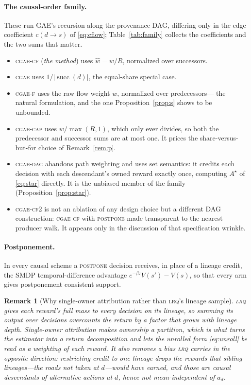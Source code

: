 \documentclass[review,authoryear,3p,times]{elsarticle}
\newtheorem{remark}{Remark}
\newcommand{\cgae}{\textsc{cgae}}              %
\newcommand{\cflow}{\textsc{cgae-cf}}          %
\newcommand{\cflowraw}{\textsc{cgae-f}}        %
\newcommand{\cdag}{\textsc{cgae-dag}}          %
\newcommand{\ccap}{\textsc{cgae-cap}}          %
\newcommand{\lrq}{\textsc{lrq}}
\newcommand{\suc}{\operatorname{succ}}
\begin{document}
\paragraph{The causal-order family.} These run GAE's recursion along the
provenance DAG, differing only in the edge coefficient $c(d\!\to\!s)$ of
\eqref{eq:cflow}; Table~\ref{tab:family} collects the coefficients and the two
sums that matter.
\begin{itemize}
\item \cflow{} (\emph{the method}) uses $\hat w = w/R$, normalized over
successors.
\item \cgae{} uses $1/|\suc(d)|$, the equal-share special case.
\item \cflowraw{} uses the raw flow weight $w$, normalized over predecessors---
the natural formulation, and the one Proposition~\ref{prop:s} shows to be
unbounded.
\item \ccap{} uses $w/\max(R,1)$, which only ever divides, so both the
predecessor and successor sums are at most one. It prices the
share-versus-but-for choice of Remark~\ref{rem:p}.
\item \cdag{} abandons path weighting and uses set semantics: it credits each
decision with each descendant's owned reward exactly once, computing
$A^{\star}$ of \eqref{eq:star} directly. It is the unbiased member of the
family (Proposition~\ref{prop:star}).
\item \textsc{cgae-cf2} is not an ablation of any design choice but a different
DAG construction: \cflow{} with \textsc{postpone} made transparent to the
nearest-producer walk. It appears only in the discussion of that specification
wrinkle.
\end{itemize}

\paragraph{Postponement.} In every causal scheme a \textsc{postpone} decision
receives, in place of a lineage credit, the SMDP
temporal-difference advantage $e^{-\beta\tau}V(s')-V(s)$, so that every arm
gives postponement consistent support.

\begin{remark}[Why single-owner attribution rather than \lrq's lineage sample]
\lrq{} gives each reward's full mass to every decision on its lineage, so
summing its output over decisions overcounts the return by a factor that grows
with lineage depth. Single-owner attribution makes ownership a partition, which
is what turns the estimator into a return decomposition and lets the unrolled
form \eqref{eq:unroll} be read as a weighting of each reward. It also removes a
bias \lrq{} carries in the opposite direction: restricting credit to one
lineage drops the rewards that sibling lineages---the roads not taken at
$d$---would have earned, and those are causal descendants of alternative actions
at $d$, hence not mean-independent of $a_d$.
\end{remark}
\end{document}
